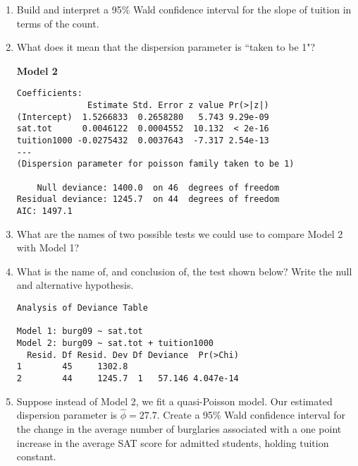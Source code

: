 \documentclass[11pt]{article}
\begin{document}
\begin{enumerate}
\item Build and interpret a 95\% Wald confidence interval for the slope of tuition in terms of the count. 

\vspace{5cm}



\item What does it mean that the dispersion parameter is ``taken to be 1"?


\pagebreak


\textbf{Model 2} 
\begin{verbatim}
Coefficients:
              Estimate Std. Error z value Pr(>|z|)    
(Intercept)  1.5266833  0.2658280   5.743 9.29e-09 
sat.tot      0.0046122  0.0004552  10.132  < 2e-16 
tuition1000 -0.0275432  0.0037643  -7.317 2.54e-13 
---
(Dispersion parameter for poisson family taken to be 1)

    Null deviance: 1400.0  on 46  degrees of freedom
Residual deviance: 1245.7  on 44  degrees of freedom
AIC: 1497.1
\end{verbatim}

\item What are the names of two possible tests we could use to compare Model 2 with Model 1? 


\vspace{5cm} 

\item What is the name of, and conclusion of, the test shown below? Write the null and alternative hypothesis. 

\begin{verbatim}
Analysis of Deviance Table

Model 1: burg09 ~ sat.tot
Model 2: burg09 ~ sat.tot + tuition1000
  Resid. Df Resid. Dev Df Deviance  Pr(>Chi)    
1        45     1302.8                          
2        44     1245.7  1   57.146 4.047e-14 
\end{verbatim}

\pagebreak



\item Suppose instead of Model 2, we fit a quasi-Poisson model. Our estimated dispersion parameter is $\widehat{\phi} = 27.7$. Create a 95\% Wald confidence interval for the change in the average number of burglaries associated with a one point increase in the average SAT score for admitted students, holding tuition constant.

\end{enumerate}
\end{document}
